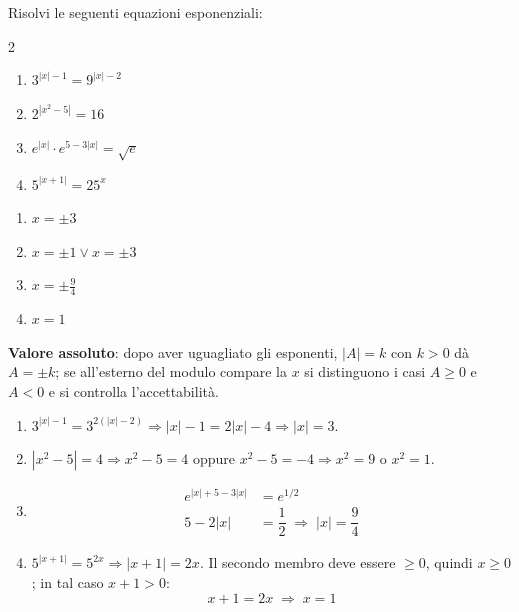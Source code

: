 
\begin{question}[ID=4.3, subtitle={Valore assoluto con esponenti di secondo grado e discussione dei casi}, difficulty=media, tags={equazioni, esponenziali, valore assoluto}]
Risolvi le seguenti equazioni esponenziali:
\begin{center}\begin{minipage}{0.92\linewidth}
\begin{multicols}{2}
\begin{enumerate}[leftmargin=3.2cm]
\item $3^{|x|-1} = 9^{|x|-2}$
\item $2^{|x^2-5|} = 16$
\item $e^{|x|} \cdot e^{5-3|x|} = \sqrt{e}$
\item $5^{|x+1|} = 25^{x}$
\end{enumerate}
\end{multicols}
\end{minipage}\end{center}
\begin{solution}
\begin{enumerate}
    \item $x=\pm3$
    \item $x=\pm1\vee x=\pm3$
    \item $x=\pm\tfrac94$
    \item $x=1$
\end{enumerate}
\end{solution}
\begin{explanation}
\textbf{Valore assoluto}: dopo aver uguagliato gli esponenti, $|A|=k$ con $k>0$ dà $A=\pm k$; se all'esterno del modulo compare la $x$ si distinguono i casi $A\geq0$ e $A<0$ e si controlla l'accettabilità.
\begin{enumerate}
    \item $3^{|x|-1}=3^{2(|x|-2)} \Rightarrow |x|-1=2|x|-4 \Rightarrow |x|=3$.
    \item $|x^2-5|=4 \Rightarrow x^2-5=4$ oppure $x^2-5=-4 \Rightarrow x^2=9$ o $x^2=1$.
    \item \[\begin{aligned}
    e^{|x|+5-3|x|} &= e^{1/2}\\
    5-2|x| &= \dfrac12 \;\Rightarrow\; |x|=\dfrac94
    \end{aligned}\]
    \item $5^{|x+1|}=5^{2x} \Rightarrow |x+1|=2x$. Il secondo membro deve essere $\geq0$, quindi $x\geq0$; in tal caso $x+1>0$:
    \[ x+1=2x \;\Rightarrow\; x=1 \]
\end{enumerate}
\end{explanation}
\end{question}

